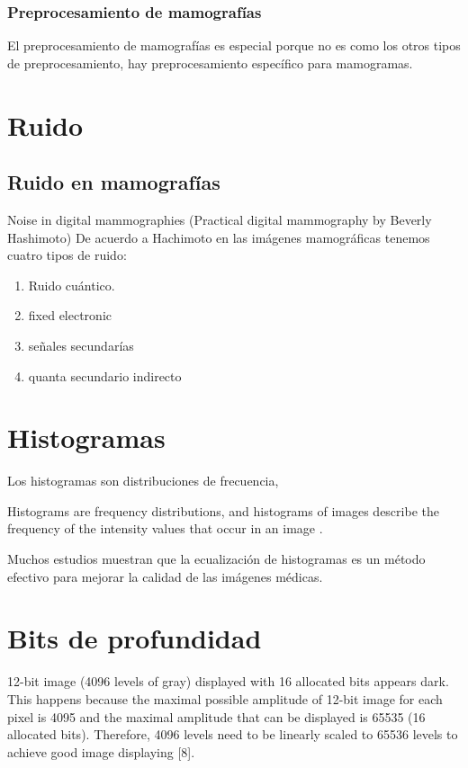 \subsubsection{Preprocesamiento de mamografías}
El preprocesamiento de mamografías es especial porque no es como los otros tipos
de preprocesamiento, hay preprocesamiento específico para mamogramas.

\section{Ruido}

\subsection{Ruido en mamografías}

\cite{hashimoto2008practical}
Noise in digital mammographies (Practical digital mammography by Beverly
Hashimoto) De acuerdo a Hachimoto en las imágenes mamográficas tenemos cuatro
tipos de ruido:

\begin{enumerate}
    \item Ruido cuántico.
    \item fixed electronic
    \item señales secundarías
    \item quanta secundario indirecto
\end{enumerate}

\section{Histogramas}
Los histogramas son distribuciones de frecuencia, 

Histograms are frequency distributions, and histograms of images describe the
frequency of the intensity values that occur in an image \cite{burger2008digital}.


Muchos estudios muestran que la ecualización de histogramas es un método
efectivo para mejorar la calidad de las imágenes médicas.

\section{Bits de profundidad}

12-bit image (4096 levels of gray) displayed with 16 allocated bits appears
dark. This happens because the maximal possible amplitude of 12-bit image for
each pixel is 4095 and the maximal amplitude that can be displayed is 65535 (16
allocated bits). Therefore, 4096 levels need to be linearly scaled to 65536
levels to achieve good image displaying [8].

